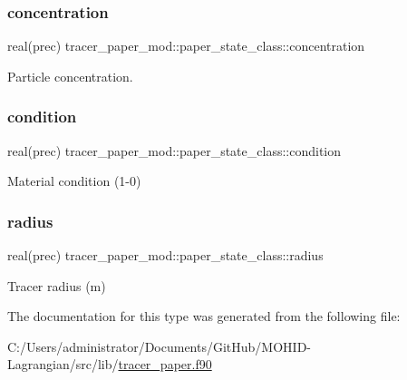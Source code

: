 \subsubsection{\texorpdfstring{concentration}{concentration}}
{\footnotesize\ttfamily real(prec) tracer\+\_\+paper\+\_\+mod\+::paper\+\_\+state\+\_\+class\+::concentration\hspace{0.3cm}{\ttfamily [private]}}



Particle concentration. 

\mbox{\label{structtracer__paper__mod_1_1paper__state__class_ad0c61709a67ed482b8f8dadb071c78a4}} 
\subsubsection{\texorpdfstring{condition}{condition}}
{\footnotesize\ttfamily real(prec) tracer\+\_\+paper\+\_\+mod\+::paper\+\_\+state\+\_\+class\+::condition\hspace{0.3cm}{\ttfamily [private]}}



Material condition (1-\/0) 

\mbox{\label{structtracer__paper__mod_1_1paper__state__class_ac70463dad7537b4e18c6719e975a2a80}} 
\subsubsection{\texorpdfstring{radius}{radius}}
{\footnotesize\ttfamily real(prec) tracer\+\_\+paper\+\_\+mod\+::paper\+\_\+state\+\_\+class\+::radius\hspace{0.3cm}{\ttfamily [private]}}



Tracer radius (m) 



The documentation for this type was generated from the following file\+:\begin{DoxyCompactItemize}
\item 
C\+:/\+Users/administrator/\+Documents/\+Git\+Hub/\+M\+O\+H\+I\+D-\/\+Lagrangian/src/lib/\hyperlink{tracer__paper_8f90}{tracer\+\_\+paper.\+f90}\end{DoxyCompactItemize}
